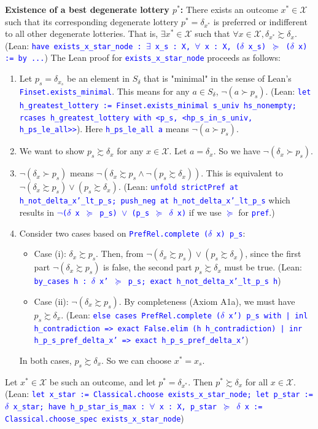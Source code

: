 \documentclass{article}
\theoremstyle{definition}
\newcommand{\X}{\mathcal{X}}
\newcommand{\tactic}[1]{\textcolor{blue}{\texttt{#1}}}
\newcommand{\pref}{\succsim} %
\newcommand{\strictpref}{\succ} %
\begin{document}
\textbf{Existence of a best degenerate lottery $p^*$:}
There exists an outcome $x^* \in \X$ such that its corresponding degenerate lottery $p^* = \delta_{x^*}$ is preferred or indifferent to all other degenerate lotteries. That is, $\exists x^* \in \X$ such that $\forall x \in \X, \delta_{x^*} \pref \delta_x$.
(Lean: \tactic{have exists\_x\_star\_node : $\exists$ x\_s : X, $\forall$ x : X, ($\delta$ x\_s) $\succeq$ ($\delta$ x) := by ...})
The Lean proof for \tactic{exists\_x\_star\_node} proceeds as follows:
\begin{enumerate}
    \item Let $p_s = \delta_{x_s}$ be an element in $S_\delta$ that is "minimal" in the sense of Lean's \tactic{Finset.exists\_minimal}. This means for any $a \in S_\delta$, $\lnot (a \strictpref p_s)$. (Lean: \tactic{let h\_greatest\_lottery := Finset.exists\_minimal s\_univ hs\_nonempty; rcases h\_greatest\_lottery with <p\_s, <hp\_s\_in\_s\_univ, h\_ps\_le\_all>>}). Here \tactic{h\_ps\_le\_all a} means $\lnot (a \strictpref p_s)$.
    \item We want to show $p_s \pref \delta_x$ for any $x \in \X$. Let $a = \delta_x$. So we have $\lnot (\delta_x \strictpref p_s)$.
    \item $\lnot (\delta_x \strictpref p_s)$ means $\lnot (\delta_x \pref p_s \land \lnot(p_s \pref \delta_x))$. This is equivalent to $\neg(\delta_x \pref p_s) \lor (p_s \pref \delta_x)$.
    (Lean: \tactic{unfold strictPref at h\_not\_delta\_x'\_lt\_p\_s; push\_neg at h\_not\_delta\_x'\_lt\_p\_s} which results in \tactic{$\lnot$($\delta$ x $\succeq$ p\_s) $\vee$ (p\_s $\succeq$ $\delta$ x)} if we use \tactic{$\succeq$} for \tactic{pref}.)
    \item Consider two cases based on \tactic{PrefRel.complete ($\delta$ x) p\_s}:
    \begin{itemize}
        \item Case (i): $\delta_x \pref p_s$. Then, from $\neg(\delta_x \pref p_s) \lor (p_s \pref \delta_x)$, since the first part $\neg(\delta_x \pref p_s)$ is false, the second part $p_s \pref \delta_x$ must be true.
        (Lean: \tactic{by\_cases h : $\delta$ x' $\succeq$ p\_s; exact h\_not\_delta\_x'\_lt\_p\_s h})
        \item Case (ii): $\neg(\delta_x \pref p_s)$. By completeness (Axiom A1a), we must have $p_s \pref \delta_x$.
        (Lean: \tactic{else cases PrefRel.complete ($\delta$ x') p\_s with | inl h\_contradiction => exact False.elim (h h\_contradiction) | inr h\_p\_s\_pref\_delta\_x' => exact h\_p\_s\_pref\_delta\_x'})
    \end{itemize}
    In both cases, $p_s \pref \delta_x$. So we can choose $x^* = x_s$.
\end{enumerate}
Let $x^* \in \X$ be such an outcome, and let $p^* = \delta_{x^*}$. Then $p^* \pref \delta_x$ for all $x \in \X$.
(Lean: \tactic{let x\_star := Classical.choose exists\_x\_star\_node; let p\_star := $\delta$ x\_star; have h\_p\_star\_is\_max : $\forall$ x : X, p\_star $\succeq$ $\delta$ x := Classical.choose\_spec exists\_x\_star\_node})
\end{document}
